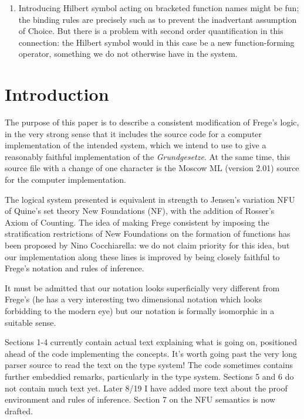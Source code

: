 \documentclass{article}
\begin{document}
\begin{description}
\begin{enumerate}
\item Introducing Hilbert symbol acting on bracketed function names might be fun;  the binding rules are precisely such as to prevent the inadvertant assumption of Choice.  But there is a problem with second
order quantification in this connection:  the Hilbert symbol would in this case be a new function-forming operator, something we do not otherwise have in the system.

\end{enumerate}

\end{description}

\section{Introduction}

The purpose of this paper is to describe a consistent modification of Frege's logic, in the very strong sense that it includes the source code for a computer implementation of the intended system, which we intend to use to give a reasonably faithful implementation of the {\em Grundgesetze\/}.  At the same time, this source file with a change of one character is the Moscow ML (version 2.01) source for the computer implementation.

The logical system presented is equivalent in strength to Jensen's variation NFU of Quine's set theory New Foundations (NF), with the addition of Rosser's Axiom of Counting.  The idea of making Frege consistent by imposing the stratification restrictions of New Foundations on the formation of functions has been proposed by Nino Cocchiarella:  we do not claim priority for this idea, but our implementation along these lines is improved by being closely faithful to Frege's notation and rules of inference. 

It must be admitted that our notation looks superficially very different from Frege's (he has a very interesting two dimensional notation which looks forbidding to the modern eye) but our notation is formally isomorphic in a suitable sense.

\newpage

Sections 1-4 currently contain actual text explaining what is going on, positioned ahead of the code implementing the concepts.  It's worth going past the very long parser source to read the text on the type system!  The code sometimes contains further embeddied remarks, particularly in the type system.  Sections 5 and 6 do not contain much text yet.  Later 8/19 I have added more text about the proof environment and rules of inference.  Section 7 on the NFU semantics is now drafted.
\end{document}
